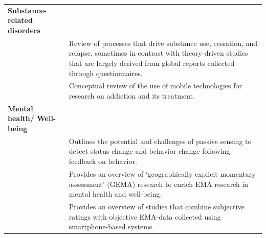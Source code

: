\documentclass[]{book}
\begin{document}
\begin{longtable}[]{@{}ll@{}}
\begin{minipage}[t]{0.33\columnwidth}\raggedright\strut
\textbf{Substance-related disorders}\strut
\end{minipage} & \begin{minipage}[t]{0.61\columnwidth}\raggedright\strut
\strut
\end{minipage}\tabularnewline
\begin{minipage}[t]{0.33\columnwidth}\raggedright\strut
\citet{Shiffman2009}\strut
\end{minipage} & \begin{minipage}[t]{0.61\columnwidth}\raggedright\strut
Review of processes that drive substance use, cessation, and relapse,
sometimes in contrast with theory-driven studies that are largely
derived from global reports collected through questionnaires.\strut
\end{minipage}\tabularnewline
\begin{minipage}[t]{0.33\columnwidth}\raggedright\strut
\citet{Swendsen2016}\strut
\end{minipage} & \begin{minipage}[t]{0.61\columnwidth}\raggedright\strut
Conceptual review of the use of mobile technologies for research on
addiction and its treatment.\strut
\end{minipage}\tabularnewline
\begin{minipage}[t]{0.33\columnwidth}\raggedright\strut
\textbf{Mental health/ Well-being}\strut
\end{minipage} & \begin{minipage}[t]{0.61\columnwidth}\raggedright\strut
\strut
\end{minipage}\tabularnewline
\begin{minipage}[t]{0.33\columnwidth}\raggedright\strut
\citet{Cornet2017}\strut
\end{minipage} & \begin{minipage}[t]{0.61\columnwidth}\raggedright\strut
Outlines the potential and challenges of passive sensing to detect
status change and behavior change following feedback on behavior.\strut
\end{minipage}\tabularnewline
\begin{minipage}[t]{0.33\columnwidth}\raggedright\strut
\citet{kirchner2016}\strut
\end{minipage} & \begin{minipage}[t]{0.61\columnwidth}\raggedright\strut
Provides an overview of `geographically explicit momentary assessment'
(GEMA) research to enrich EMA research in mental health and
well-being.\strut
\end{minipage}\tabularnewline
\begin{minipage}[t]{0.33\columnwidth}\raggedright\strut
\citet{Dogan2017}\strut
\end{minipage} & \begin{minipage}[t]{0.61\columnwidth}\raggedright\strut
Provides an overview of studies that combine subjective ratings with
objective EMA-data collected using smartphone-based systems.\strut
\end{minipage}\tabularnewline
\bottomrule
\end{longtable}
\end{document}
